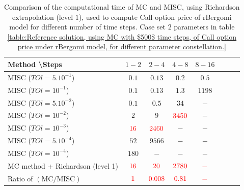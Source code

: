 \documentclass[11pt]{article}
\begin{document}
\begin{table}[h!]
	\centering
	\begin{tabular}{l*{6}{c}r}
		Method \textbackslash  Steps            & $1-2$ & $2-4$ & $4-8$ & $8-16$ &   \\
		\hline
			MISC ($TOl=5.10^{-1}$)  & $0.1$ & $0.13$ & $0.2$ & $0.5$  \\
		MISC ($TOl=10^{-1}$)  & $0.1$ & $0.13$ & $1.3$ & $1198$  \\
			MISC ($TOl=5.10^{-2}$)  & $0.1$ & $0.5$ & $34$ & $-$  \\
		MISC ($TOl=10^{-2}$)  & $2$ & $9$ & ${\color{red}3450}$ & $-$  \\
			MISC ($TOl=10^{-3}$)  & ${\color{red}16}$ & ${\color{red}2460}$ & $-$ & $-$  \\
			
				MISC ($TOl=5.10^{-4}$)  & $52$ & $9566$ & $-$ & $-$  \\
				MISC ($TOl=10^{-4}$)  & $180$ & $-$ & $-$ & $-$  \\
		\hline	
			MC method + Richardson (level 1)  &${\color{red}16}$ & ${\color{red}20}$  & ${\color{red}2780}$  & ${\color{red}-}$ \\
			
\hline	
	Ratio of $\left(\text{MC}/ \text{MISC} \right)$  &${\color{red}1}$ & ${\color{red}    0.008
	}$  & ${\color{red} 0.81
}$  & ${\color{red}-}$ \\
		\hline
	\end{tabular}
	\caption{Comparison of the computational time of  MC and MISC, using Richardson extrapolation (level $1$), used to compute Call option price of rBergomi model for different number of time steps. Case set $2$ parameters in table \ref{table:Reference solution, using MC with $500$ time steps, of Call option price under rBergomi model, for different parameter constellation.}}
	\label{Comparsion of the computational time of  MC and MISC, using Richardson extrapolation (level $1$), used to compute Call option price of rBergomi model for different number of time steps. Case set $2$ parameters}
\end{table}
\end{document}
